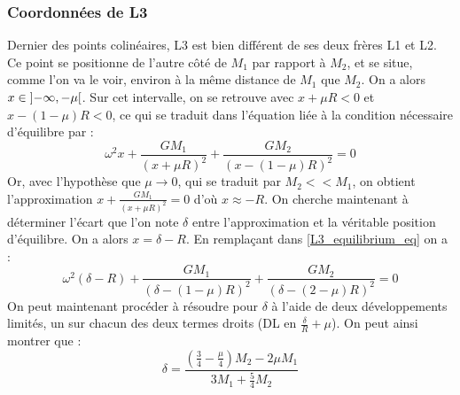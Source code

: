 \documentclass[12pt]{article}
\begin{document}
	
	\subsubsection{Coordonnées de L3}
	Dernier des points colinéaires, L3 est bien différent de ses deux frères L1 et L2. Ce point se positionne de l'autre côté de $M_1$ par rapport à $M_2$, et se situe, comme l'on va le voir, environ à la même distance de $M_1$ que $M_2$.
	On a alors $x \in \interval[open]{-\infty}{-\mu}$. Sur cet intervalle, on se retrouve avec $x+\mu R<0$ et $x-(1-\mu)R<0$, ce qui se traduit dans l'équation liée à la condition nécessaire d'équilibre par :
	\begin{equation}
		\label{L3_equilibrium_eq}
		\omega^2x + \frac{GM_1}{(x+\mu R)^2} + \frac{GM_2}{(x-(1-\mu)R)^2} = 0
	\end{equation}
	Or, avec l'hypothèse que $\mu \to 0$, qui se traduit par $M_2 << M_1$, on obtient l'approximation $x + \frac{GM_1}{(x+\mu R)^2}=0$ d'où $x \approx -R$. On cherche maintenant à déterminer l'écart que l'on note $\delta$ entre l'approximation et la véritable position d'équilibre. On a alors $x = \delta-R$. En remplaçant dans \ref{L3_equilibrium_eq} on a :
	\begin{equation}
		\omega^2(\delta-R) + \frac{GM_1}{(\delta-(1-\mu)R)^2}+\frac{GM_2}{(\delta-(2-\mu)R)^2} = 0
	\end{equation}
	On peut maintenant procéder à résoudre pour $\delta$ à l'aide de deux développements limités, un sur chacun des deux termes droits (DL en $\frac{\delta}{R}+\mu$). On peut ainsi montrer que :
	\begin{equation}
		\delta = \frac{(\frac{3}{4}-\frac{\mu}{4})M_2-2\mu M_1}{3M_1+\frac{5}{4}M_2}
	\end{equation}
	
	
\end{document}

